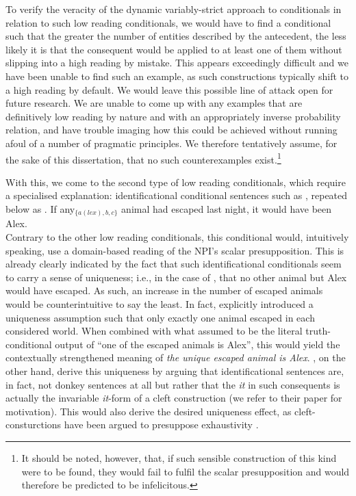 To verify the veracity of the dynamic variably-strict approach to conditionals in relation to such low reading conditionals, we would have to find a conditional such that the greater the number of entities described by the antecedent, the less likely it is that the consequent would be applied to at least one of them without slipping into a high reading by mistake. This appears exceedingly difficult and we have been unable to find such an example, as such constructions typically shift to a high reading by default. We would leave this possible line of attack open for future research. We are unable to come up with any examples that are definitively low reading by nature and with an appropriately inverse probability relation, and have trouble imaging how this could be achieved without running afoul of a number of pragmatic principles. We therefore tentatively assume, for the sake of this dissertation, that no such counterexamples exist.\footnote{It should be noted, however, that, if such sensible construction of this kind were to be found, they would fail to fulfil the scalar presupposition and would therefore be predicted to be infelicitous.}

With this, we come to the second type of low reading conditionals, which require a specialised explanation: identificational conditional sentences such as , repeated below as .
\ex{}
If any$_{\{a(lex),b,c\}}$ animal had escaped last night, it would have been Alex.\\\emptyfill\parencite[adapted from][p.~300]{Walker2015}\label{ex:lowreading-npi2-2}
\xe
Contrary to the other low reading conditionals, this conditional would, intuitively speaking, use a domain-based reading of the NPI's scalar presupposition. This is already clearly indicated by the fact that such identificational conditionals seem to carry a sense of uniqueness; i.e., in the case of , that no other animal but Alex would have escaped. As such, an increase in the number of escaped animals would be counterintuitive to say the least. In fact, \textcite[p.~395]{vanRooij2006} explicitly introduced a uniqueness assumption such that only exactly one animal escaped in each considered world. When combined with what \textcite{vanRooij2006} assumed to be the literal truth-conditional output of \enquote{one of the escaped animals is Alex}, this would yield the contextually strengthened meaning of \textit{the unique escaped animal is Alex}. \textcite[p.~300f]{Walker2015}, on the other hand, derive this uniqueness by arguing that identificational sentences are, in fact, not donkey sentences at all but rather that the \textit{it} in such consequents is actually the invariable \textit{it}-form of a cleft construction (we refer to their paper for motivation). This would also derive the desired uniqueness effect, as cleft-consturctions have been argued to presuppose exhaustivity \parencite[e.g.][]{Buring2011}. 

